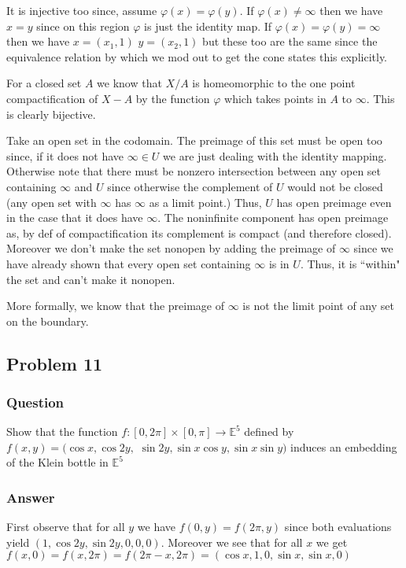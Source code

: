 \documentclass[10pt]{article}
\begin{document}
It is injective too since, assume $\varphi(x)= \varphi(y)$. If $\varphi(x) \neq \infty$ then we have $x = y$ since on this region $\varphi$ is just the identity map. If $\varphi(x)= \varphi(y)= \infty$ then we have $x=(x_1,1)$ $y=(x_2,1)$ but these too are the same since the equivalence relation by which we mod out to get the cone states this explicitly.

For a closed set $A$ we know that $X / A $ is homeomorphic to the one point compactification of $X-A$ by the function $\varphi$ which takes points in $A$ to $\infty$. This is clearly bijective.


Take an open set in the codomain. The preimage of this set must be open too since, if it does not have $\infty \in U$  we are just dealing with the identity mapping. Otherwise note that there must be nonzero intersection between any open set containing $\infty$ and $U$ since otherwise the complement of $U$ would not be closed (any open set with $\infty$ has $\infty$ as a limit point.) Thus, $U$ has open preimage even in the case that it does have $\infty$. The noninfinite component has open preimage as, by def of compactification its complement is compact (and therefore closed). Moreover we don't make the set nonopen by adding the preimage of $\infty$ since we have already shown that every open set containing $\infty$ is in $U$. Thus, it is ``within" the set and can't make it nonopen.

More formally, we know that the preimage of $\infty$ is not the limit point of any set on the boundary.

\subsection{Problem 11}

\subsubsection{Question}
Show that the function $f: [0,2 \pi ] \times [0,\pi] \to \mathbb{E}^5$ defined by $f(x,y) = (\cos{x}, \cos{2 y },$ $ \sin{2 y}, \sin{x} \cos{y}, \sin{x}\sin{y})$ induces an embedding of the Klein bottle in $\mathbb{E}^5$
\subsubsection{Answer}
First observe that for all $y$ we have $f(0,y)=f(2 \pi , y)$ since both evaluations yield $(1,\cos{2 y},\sin{2 y},0,0,0)$. Moreover we see that for all $x$ we get $f(x,0)=f(x,2 \pi)=f(2\pi - x,2 \pi)= (\cos{x},1,0,\sin{x},\sin{x},0) $
\end{document}
